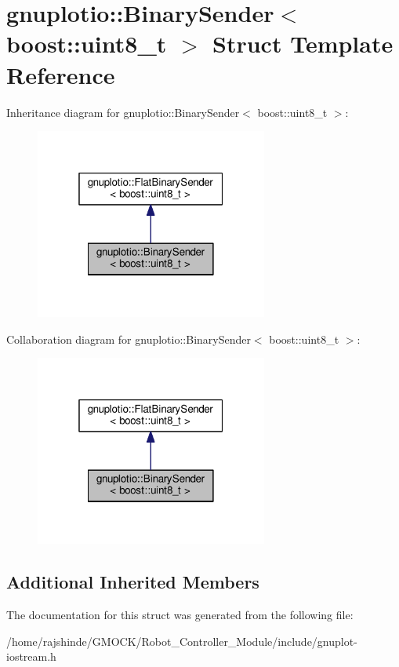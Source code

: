 \hypertarget{structgnuplotio_1_1_binary_sender_3_01boost_1_1uint8__t_01_4}{}\section{gnuplotio\+:\+:Binary\+Sender$<$ boost\+:\+:uint8\+\_\+t $>$ Struct Template Reference}
\label{structgnuplotio_1_1_binary_sender_3_01boost_1_1uint8__t_01_4}


Inheritance diagram for gnuplotio\+:\+:Binary\+Sender$<$ boost\+:\+:uint8\+\_\+t $>$\+:
\nopagebreak
\begin{figure}[H]
\begin{center}
\leavevmode
\includegraphics[width=217pt]{structgnuplotio_1_1_binary_sender_3_01boost_1_1uint8__t_01_4__inherit__graph}
\end{center}
\end{figure}


Collaboration diagram for gnuplotio\+:\+:Binary\+Sender$<$ boost\+:\+:uint8\+\_\+t $>$\+:
\nopagebreak
\begin{figure}[H]
\begin{center}
\leavevmode
\includegraphics[width=217pt]{structgnuplotio_1_1_binary_sender_3_01boost_1_1uint8__t_01_4__coll__graph}
\end{center}
\end{figure}
\subsection*{Additional Inherited Members}


The documentation for this struct was generated from the following file\+:\begin{DoxyCompactItemize}
\item 
/home/rajshinde/\+G\+M\+O\+C\+K/\+Robot\+\_\+\+Controller\+\_\+\+Module/include/gnuplot-\/iostream.\+h\end{DoxyCompactItemize}
